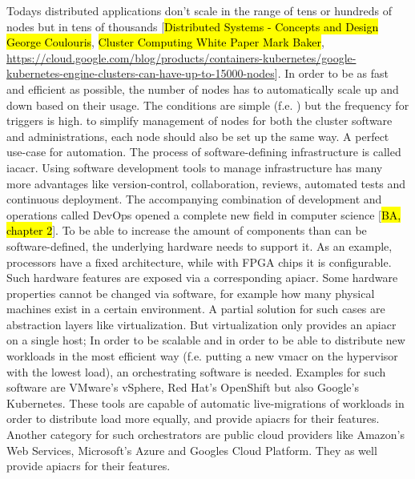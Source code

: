 Todays distributed applications don't scale in the range of tens or hundreds of nodes but in tens of thousands [\hl{Distributed Systems - Concepts and Design George Coulouris}, \hl{Cluster Computing White Paper Mark Baker}, \url{https://cloud.google.com/blog/products/containers-kubernetes/google-kubernetes-engine-clusters-can-have-up-to-15000-nodes}]. In order to be as fast and efficient as possible, the number of nodes has to automatically scale up and down based on their usage. The conditions are simple (f.e. ) but the frequency for triggers is high. to simplify management of nodes for both the cluster software and administrations, each node should also be set up the same way. A perfect use-case for automation.
\newline
The process of software-defining infrastructure is called \gls{iacacr}. Using software development tools to manage infrastructure has many more advantages like version-control, collaboration, reviews, automated tests and continuous deployment. The accompanying combination of development and operations called DevOps opened a complete new field in computer science [\hl{BA, chapter 2}]. To be able to increase the amount of components than can be software-defined, the underlying hardware needs to support it. As an example, processors have a fixed architecture, while with FPGA chips it is configurable.
\newline
Such hardware features are exposed via a corresponding \gls{apiacr}. Some hardware properties cannot be changed via software, for example how many physical machines exist in a certain environment. A partial solution for such cases are abstraction layers like virtualization.
\newline
But virtualization only provides an \gls{apiacr} on a single host; In order to be scalable and in order to be able to distribute new workloads in the most efficient way (f.e. putting a new \gls{vmacr} on the hypervisor with the lowest load), an orchestrating software is needed. Examples for such software are VMware's vSphere, Red Hat's OpenShift but also Google's Kubernetes.
\newline
These tools are capable of automatic live-migrations of workloads in order to distribute load more equally, and provide \gls{apiacr}s for their features. 
\newline
Another category for such orchestrators are public cloud providers like Amazon's Web Services, Microsoft's Azure and Googles Cloud Platform. They as well provide \gls{apiacr}s for their features.
